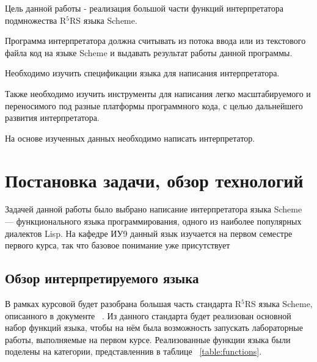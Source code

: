 \documentclass[14pt, russian]{scrartcl}
\begin{document}
Цель данной работы - реализация большой части функций интерпретатора подмножества R$^5$RS языка Scheme.

Программа интерпретатора должна считывать из потока ввода или из текстового файла код на языке Scheme и выдавать результат работы данной программы.

Необходимо изучить спецификации языка для написания интерпретатора.

Также необходимо изучить инструменты для написания легко масштабируемого и переносимого под разные платформы программного кода, с целью дальнейшего развития интерпретатора.

На основе изученных данных необходимо написать интерпретатор.

\section{Постановка задачи, обзор технологий}

Задачей данной работы было выбрано написание интерпретатора языка Scheme --- функционального языка программирования, одного из наиболее популярных диалектов Lisp. На кафедре ИУ9 данный язык изучается на первом семестре первого курса, так что базовое понимание уже присутствует

\subsection{Обзор интерпретируемого языка}

В рамках курсовой будет разобрана большая часть стандарта R$^5$RS языка Scheme, описанного в документе  ~\cite{R5rs}. Из данного стандарта будет реализован основной набор функций языка, чтобы на нём была возможность запускать лабораторные работы, выполняемые на первом курсе. Реализованные функции языка были поделены на категории, представленнив в таблице ~\ref{table:functions}.

\bigskip
\end{document}
